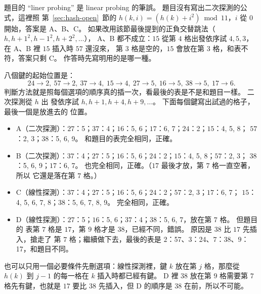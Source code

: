 題目的 ``liner probing'' 是 linear probing 的筆誤。 題目沒有寫出二次探測的公式，這裡照
第~\ref{sec:hash-open}~節的 $h(k, i) = (h(k) + i^2) \bmod 11$，$i$ 從 $0$ 開始，答案是
A、B、C。 如果改用該節最後提到的正負交替跳法（$h, h + 1^2, h - 1^2, h + 2^2, \ldots$），
A、B 都不成立：$15$ 從第 $4$ 格出發依序試 $4, 5, 3$，在 A、B 裡 $15$ 插入時 $57$ 還沒來，
第 $3$ 格是空的，$15$ 會放在第 $3$ 格，和表不符，答案只剩 C。 作答時先寫明用的是哪一種。

八個鍵的起始位置是：
\[
24 \to 2,\ 57 \to 2,\ 37 \to 4,\ 15 \to 4,\ 27 \to 5,\ 16 \to 5,\ 38 \to 5,\ 17 \to 6 .
\]
判斷方法就是照每個選項的順序真的插一次，看最後的表是不是和題目一樣。 二次探測從 $h$ 出
發依序試 $h, h + 1, h + 4, h + 9, \ldots$。 下面每個鍵寫出試過的格子，最後一個是放進去的
位置。
\begin{itemize}
\item A（二次探測）：$27$：5；$37$：4；$16$：5, 6；$17$：6, 7；$24$：2；$15$：4, 5, 8；
$57$：2, 3；$38$：5, 6, 9。 和題目的表完全相同，正確。
\item B（二次探測）：$37$：4；$27$：5；$16$：5, 6；$24$：2；$15$：4, 5, 8；$57$：2, 3；
$38$：5, 6, 9；$17$：6, 7。 也完全相同，正確。（$17$ 最後才放，第 $7$ 格一直空著，所以
它還是落在第 $7$ 格。）
\item C（線性探測）：$37$：4；$27$：5；$16$：5, 6；$24$：2；$57$：2, 3；$17$：6, 7；
$15$：4, 5, 6, 7, 8；$38$：5, 6, 7, 8, 9。 完全相同，正確。
\item D（線性探測）：$27$：5；$16$：5, 6；$37$：4；$38$：5, 6, 7，放在第 $7$ 格。 但題目的
表第 $7$ 格是 $17$，第 $9$ 格才是 $38$，已經不同，錯誤。 原因是 $38$ 比 $17$ 先插入，搶走了
第 $7$ 格；繼續做下去，最後的表是 $2$：57、$3$：24、$7$：38、$9$：17，和題目不同。
\end{itemize}
也可以只用一個必要條件先刪選項：線性探測裡，鍵 $k$ 放在第 $j$ 格，那麼從 $h(k)$ 到
$j - 1$ 的每一格在 $k$ 插入時都已經有鍵。 D 裡 $38$ 放在第 $9$ 格需要第 $7$ 格先有鍵，也就是
$17$ 要比 $38$ 先插入，但 D 的順序是 $38$ 在前，所以不可能。


